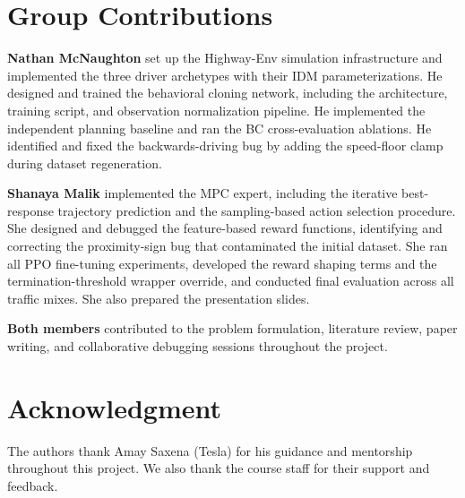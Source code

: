 \documentclass[conference]{IEEEtran}
\begin{document}
\section{Group Contributions}
\label{sec:contributions}

\textbf{Nathan McNaughton} set up the Highway-Env simulation infrastructure
and implemented the three driver archetypes with their IDM parameterizations.
He designed and trained the behavioral cloning network, including the
architecture, training script, and observation normalization pipeline.
He implemented the independent planning baseline and ran the BC
cross-evaluation ablations.
He identified and fixed the backwards-driving bug by adding the speed-floor
clamp during dataset regeneration.

\textbf{Shanaya Malik} implemented the MPC expert, including the iterative
best-response trajectory prediction and the sampling-based action selection
procedure.
She designed and debugged the feature-based reward functions, identifying and
correcting the proximity-sign bug that contaminated the initial dataset.
She ran all PPO fine-tuning experiments, developed the reward shaping
terms and the termination-threshold wrapper override, and conducted
final evaluation across all traffic mixes.
She also prepared the presentation slides.

\textbf{Both members} contributed to the problem formulation, literature review,
paper writing, and collaborative debugging sessions throughout the project.

\section*{Acknowledgment}

The authors thank Amay Saxena (Tesla) for his guidance and mentorship
throughout this project. We also thank the course staff for their support and feedback.
\end{document}
